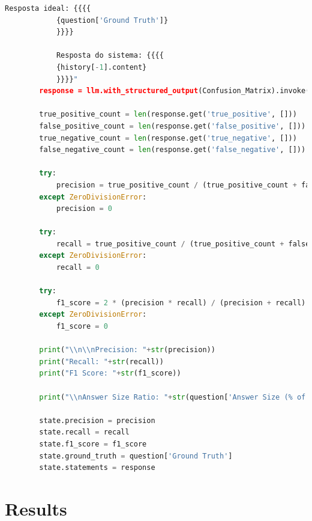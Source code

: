 \begin{lstlisting}[style=mystyle, language=Python, caption={C\'{o}digo para LLM-as-a-Judge}, label={code:llm-judge}]
            Resposta ideal: {{{{
            {question['Ground Truth']}
            }}}}

            Resposta do sistema: {{{{
            {history[-1].content}
            }}}}"
        response = llm.with_structured_output(Confusion_Matrix).invoke(prompt_confusion_matrix)

        true_positive_count = len(response.get('true_positive', []))
        false_positive_count = len(response.get('false_positive', []))
        true_negative_count = len(response.get('true_negative', []))
        false_negative_count = len(response.get('false_negative', []))

        try:
            precision = true_positive_count / (true_positive_count + false_positive_count)
        except ZeroDivisionError:
            precision = 0
        
        try:
            recall = true_positive_count / (true_positive_count + false_negative_count)
        except ZeroDivisionError:
            recall = 0

        try:
            f1_score = 2 * (precision * recall) / (precision + recall)
        except ZeroDivisionError:
            f1_score = 0
            
        print("\\n\\nPrecision: "+str(precision))
        print("Recall: "+str(recall))
        print("F1 Score: "+str(f1_score))

        print("\\nAnswer Size Ratio: "+str(question['Answer Size (% of GT)']))

        state.precision = precision
        state.recall = recall
        state.f1_score = f1_score
        state.ground_truth = question['Ground Truth']
        state.statements = response
\end{lstlisting}

    \section{Results}
    \label{sec:exp2_appendix}



